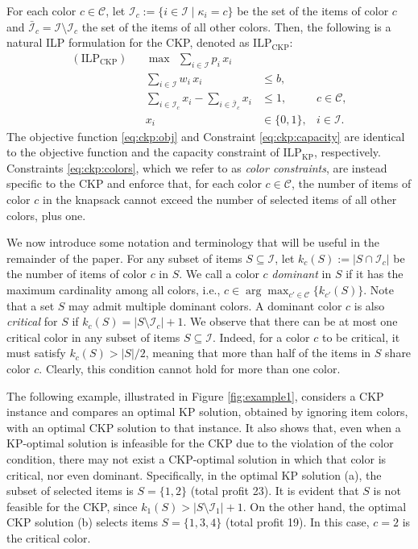 \documentclass[preprint,11pt]{elsarticle}
\newcommand{\items}{\mathcal{I}}
\newcommand{\colors}{\mathcal{C}}
\newcommand{\profit}{p}
\newcommand{\weight}{w}
\newcommand{\capacity}{b}
\newcommand{\formKP}{\text{ILP}_\text{KP}}
\newcommand{\formCKP}{\text{ILP}_\text{CKP}}
\theoremstyle{definition}
\begin{document}
For each color $c \in \colors$, let $\items_c := \{i \in \items \mid \kappa_i = c\}$ be the set of the items of color $c$ and $\bar{\items}_c = \items \setminus \items_c$ the set of the items of all other colors. 
Then, the following is a natural ILP formulation for the CKP, denoted as $\formCKP$:
\begin{subequations}\label{form:CKP}
\begin{align}
(\formCKP)  && \max ~~\sum_{i \in \items} \profit_i \, x_i \label{eq:ckp:obj}\\
  &&\sum_{i \in \items} \weight_i \, x_i & \leq \capacity, \label{eq:ckp:capacity}\\
  &&\sum_{i \in \items_c}x_i - \sum_{i \in \bar{\items}_c}x_i & \leq 1, & c \in \colors, \label{eq:ckp:colors}\\
  && x_i&\in\{0,1\}, & i \in \items. \label{eq:ckp:integrality}
\end{align}
\end{subequations}
The objective function \eqref{eq:ckp:obj} and Constraint \eqref{eq:ckp:capacity} are identical to the objective function and the capacity constraint of $\formKP$, respectively. Constraints \eqref{eq:ckp:colors}, which we refer to as \emph{color constraints}, are instead specific to the CKP and enforce that, for each color $c \in \colors$, the number of items of color $c$ in the knapsack cannot exceed the number of selected items of all other colors, plus one. 

We now introduce some notation and terminology that will be useful in the remainder of the paper. For any subset of items $S \subseteq \items$, let $k_c(S) := |S \cap \items_c|$ be the number of items of color $c$ in $S$. 
We call a color $c$ \emph{dominant} in $S$ if it has the maximum cardinality among all colors, i.e., $c \in \arg\max_{c' \in \colors} \{k_{c'}(S) \}$. 
Note that a set $S$ may admit multiple dominant colors.
A dominant color $c$ is also \emph{critical} for $S$ if
$
k_c(S) = |S \setminus \items_c| + 1.
$
We observe that there can be at most one critical color in any subset of items $S \subseteq \items$. Indeed, for a color $c$ to be critical, it must satisfy $k_c(S) > |S|/2$, meaning that more than half of the items in $S$ share color $c$. Clearly, this condition cannot hold for more than one color. 

The following example, illustrated in Figure \ref{fig:example1}, considers a CKP instance and compares an optimal KP solution, obtained by ignoring item colors, with an optimal CKP solution to that instance. It also shows that, even when a KP-optimal solution is infeasible for the CKP due to the violation of the color condition, there may not exist a CKP-optimal solution in which that color is critical, nor even dominant. Specifically, in the optimal KP solution (a), the subset of selected items is $S=\{1,2\}$ (total profit 23). It is evident that $S$ is not feasible for the CKP, since $k_1(S) > |S \setminus \items_1| + 1$.
On the other hand, the optimal CKP solution (b) selects items $S=\{1,3,4\}$ (total profit 19). In this case, $c=2$ is the critical color.
\end{document}
